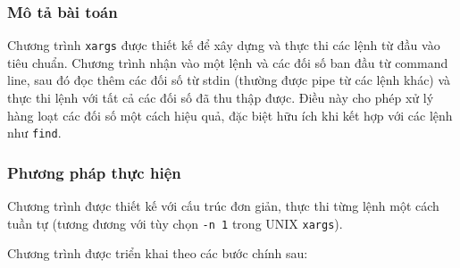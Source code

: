 \subsubsection{Mô tả bài toán}
Chương trình \texttt{xargs} được thiết kế để xây dựng và thực thi các lệnh từ đầu vào tiêu chuẩn. Chương trình nhận vào một lệnh và các đối số ban đầu từ command line, sau đó đọc thêm các đối số từ stdin (thường được pipe từ các lệnh khác) và thực thi lệnh với tất cả các đối số đã thu thập được. Điều này cho phép xử lý hàng loạt các đối số một cách hiệu quả, đặc biệt hữu ích khi kết hợp với các lệnh như \texttt{find}.

\subsubsection{Phương pháp thực hiện}
Chương trình được thiết kế với cấu trúc đơn giản, thực thi từng lệnh một cách tuần tự (tương đương với tùy chọn \texttt{-n 1} trong UNIX \texttt{xargs}).

Chương trình được triển khai theo các bước chính sau:

